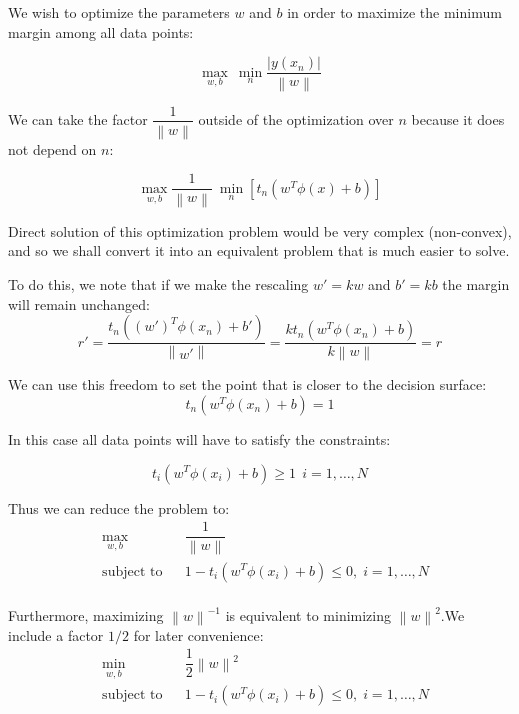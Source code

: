 \documentclass[twoside]{article}
\newcommand{\norm}[1]{\left\lVert #1 \right\rVert}
\begin{document}
We wish to optimize the parameters $w$ and $b$ in order to maximize the minimum margin among all data points:

\begin{equation*}
\max_{w,b} \  \min_{n}   \dfrac{\lvert y(x_{n}) \rvert}{\norm{w}} 
\end{equation*}

We can take the factor $\dfrac{1}{\norm{w}}$ outside of the optimization over $n$ because it does not depend on $n$:

\begin{equation*}
\max_{w,b} \dfrac{1}{\norm{w}} \ \min_{n}  [t_{n} (w^T \phi(x) +b) ]
\end{equation*}

Direct solution of this optimization problem would be very complex (non-convex), and so we shall convert it into an equivalent problem that is much easier to solve. 

To do this, we note that if we make the rescaling $w' = kw$ and $b' = kb$ the margin will remain unchanged: 
\begin{equation*}
    r' = \dfrac{t_{n}((w')^T \phi(x_{n}) +b')}{\norm{w'}} = \dfrac{k t_{n} (w^T \phi(x_{n}) + b)}{k \norm{w}} = r
\end{equation*}

We can use this freedom to set the point that is closer to the decision surface:
\begin{equation*}
    t_{n} (w^T \phi(x_{n}) +b) = 1
\end{equation*}

In this case all data points will have to satisfy the constraints:

\begin{equation*}
    t_{i} (w^T \phi(x_{i}) +b) \geq 1 \ \ i = 1,\dotsc,N
\end{equation*}

Thus we can reduce the problem to:
\begin{equation*}
\begin{aligned}
& \underset{w,b}{\text{max}}
& & \dfrac{1}{\norm{w}}\\
& \text{subject to}
& & 1 - t_{i} (w^T \phi(x_{i}) +b)  \leq 0, \; i = 1, \ldots, N \\
\end{aligned}
\end{equation*}

Furthermore, maximizing ${\norm{w}^{-1}}$ is equivalent to minimizing $ \norm{w}^2$.We include a factor $1/2$ for later convenience:
\begin{equation*}
\begin{aligned}
& \underset{w,b}{\text{min}}
& & \dfrac{1}{2} \norm{w}^2\\
& \text{subject to}
& & 1 - t_{i} (w^T \phi(x_{i}) +b)  \leq 0, \; i = 1, \ldots, N \\
\end{aligned}
\end{equation*}
\end{document}
